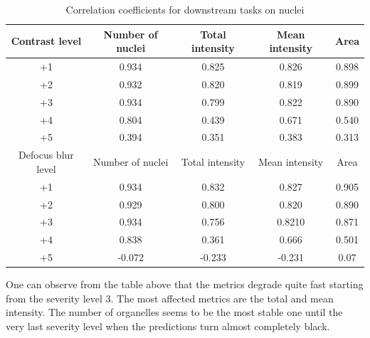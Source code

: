 \begin{table}[htb]
    \centering
    \caption{Correlation coefficients for downstream tasks on nuclei}
        \begin{adjustbox}{width=0.7\linewidth}
            \begin{tabular}{|c|c|c|c|c|}\hline
                Contrast level&Number of nuclei&Total intensity&Mean intensity&Area\\\hline\hline
                +1&0.934&0.825&0.826&0.898\\\hline
                +2&0.932&0.820&0.819&0.899\\\hline
                +3&0.934&0.799&0.822&0.890\\\hline
                +4&0.804&0.439&0.671&0.540\\\hline
                +5&0.394&0.351&0.383&0.313\\\hline \hline
				Defocus blur level&Number of nuclei&Total intensity&Mean intensity&Area\\\hline\hline
                +1&0.934&0.832&0.827&0.905\\\hline
                +2&0.929&0.800&0.820&0.890\\\hline
                +3&0.934&0.756&0.8210&0.871\\\hline
                +4&0.838&0.361&0.666&0.501\\\hline
                +5&-0.072&-0.233&-0.231&0.07\\\hline
            \end{tabular}
        \label{table:nuclei-corruptions-downstream-metrics-coefficients}
        \end{adjustbox}
\end{table}

One can observe from the table above that the metrics degrade quite fast starting from the severity level $3$. The most affected metrics are the total and mean intensity. The number of organelles seems to be the most stable one until the very last severity level when the predictions turn almost completely black. 